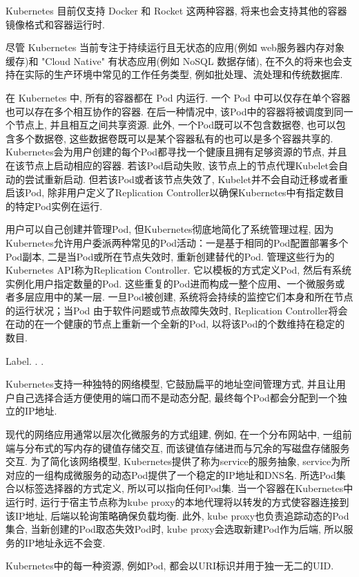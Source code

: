 \documentclass[UTF8,a4paper]{ctexart}
\begin{document}
Kubernetes 目前仅支持 Docker 和 Rocket 这两种容器, 将来也会支持其他的容器镜像格式和容器运行时.

尽管 Kubernetes 当前专注于持续运行且无状态的应用(例如  web服务器内存对象缓存)和 "Cloud Native" 有状态应用(例如 NoSQL 数据存储), 在不久的将来也会支持在实际的生产环境中常见的工作任务类型, 例如批处理、流处理和传统数据库.

在 Kubernetes 中, 所有的容器都在 Pod 内运行. 一个 Pod 中可以仅存在单个容器也可以存在多个相互协作的容器. 在后一种情况中, 该Pod中的容器将被调度到同一个节点上, 并且相互之间共享资源. 此外, 一个Pod既可以不包含数据卷, 也可以包含多个数据卷, 这些数据卷既可以是某个容器私有的也可以是多个容器共享的. Kubernetes会为用户创建的每个Pod都寻找一个健康且拥有足够资源的节点, 并且在该节点上启动相应的容器. 若该Pod启动失败, 该节点上的节点代理Kubelet会自动的尝试重新启动. 但若该Pod或者该节点失效了, Kubelet并不会自动迁移或者重启该Pod, 除非用户定义了Replication Controller以确保Kubernetes中有指定数目的特定Pod实例在运行.

用户可以自己创建并管理Pod, 但Kubernetes彻底地简化了系统管理过程, 因为Kubernetes允许用户委派两种常见的Pod活动：一是基于相同的Pod配置部署多个Pod副本, 二是当Pod或所在节点失效时, 重新创建替代的Pod. 管理这些行为的Kubernetes API称为Replication Controller. 它以模板的方式定义Pod, 然后有系统实例化用户指定数量的Pod. 这些重复的Pod进而构成一整个应用、一个微服务或者多层应用中的某一层. 一旦Pod被创建, 系统将会持续的监控它们本身和所在节点的运行状况；当Pod 由于软件问题或节点故障失效时, Replication Controller将会在动的在一个健康的节点上重新一个全新的Pod, 以将该Pod的个数维持在稳定的数目.

Label. . .

Kubernetes支持一种独特的网络模型, 它鼓励扁平的地址空间管理方式, 并且让用户自己选择合适方便使用的端口而不是动态分配, 最终每个Pod都会分配到一个独立的IP地址.

现代的网络应用通常以层次化微服务的方式组建, 例如, 在一个分布网站中, 一组前端与分布式的写内存的键值存储交互, 而该键值存储进而与冗余的写磁盘存储服务交互. 为了简化该网络模型, Kubernetes提供了称为service的服务抽象, service为所对应的一组构成微服务的动态Pod提供了一个稳定的IP地址和DNS名. 所选Pod集合以标签选择器的方式定义, 所以可以指向任何Pod集. 当一个容器在Kubernetes中运行时, 运行于宿主节点称为kube proxy的本地代理将以转发的方式使容器连接到该IP地址, 后端以轮询策略确保负载均衡. 此外, kube proxy也负责追踪动态的Pod集合, 当新创建的Pod取态失效Pod时, kube proxy会选取新建Pod作为后端, 所以服务的IP地址永远不会变.

Kubernetes中的每一种资源, 例如Pod, 都会以URI标识并用于独一无二的UID.
\end{document}
